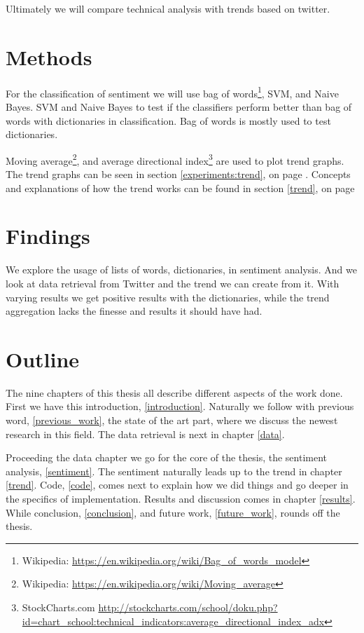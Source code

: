 Ultimately we will compare technical analysis with trends based on twitter. 

\section{Methods}

For the classification of sentiment we will use bag of words\footnote{Wikipedia:
\url{https://en.wikipedia.org/wiki/Bag_of_words_model}}, SVM, and Naive Bayes.
SVM and Naive Bayes to test if the classifiers perform better than bag of words
with dictionaries in classification. Bag of words is mostly used to test
dictionaries.

Moving average\footnote{Wikipedia:
\url{https://en.wikipedia.org/wiki/Moving_average}}, and average directional
index\footnote{StockCharts.com
\url{http://stockcharts.com/school/doku.php?id=chart_school:technical_indicators:average_directional_index_adx}}
are used to plot trend graphs. The trend graphs can be seen in section
\ref{experiments:trend}, on
page \pageref{experiments:trend}. Concepts and explanations of how the trend
works can be found in section \ref{trend}, on page \pageref{trend}

\section{Findings}
We explore the usage of lists of words, dictionaries, in sentiment analysis.
And we look at data retrieval from Twitter and the trend we can create from it. 
With varying results we get positive results with the dictionaries, while the
trend aggregation lacks the finesse and results it should have had. 

\section{Outline}
The nine chapters of this thesis all describe different aspects of the work
done. First we have this introduction, \ref{introduction}. Naturally we follow
with previous word, \ref{previous_work}, the state of the art part, where we
discuss the newest research in this field. The data retrieval is next in
chapter \ref{data}. 

Proceeding the data chapter we go for the core of the thesis, the sentiment
analysis, \ref{sentiment}. The sentiment naturally leads up to the trend in
chapter \ref{trend}. Code, \ref{code}, comes next to explain how we did things
and go deeper in the specifics of implementation. Results and discussion comes
in chapter \ref{results}. While conclusion, \ref{conclusion}, and future work,
\ref{future_work}, rounds off the thesis.
%
